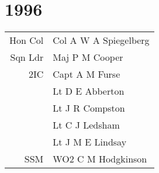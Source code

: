 \chapter*{1996}

\begin{center}
  \begin{tabular}{rl}
    Hon Col & Col A W A Spiegelberg \\
    Sqn Ldr & Maj P M Cooper \\
    2IC & Capt A M Furse \\
    & Lt D E Abberton \\
    & Lt J R Compston \\
    & Lt C J Ledsham \\
    & Lt J M E Lindsay \\
    SSM & WO2 C M Hodgkinson \\
  \end{tabular}
\end{center}

